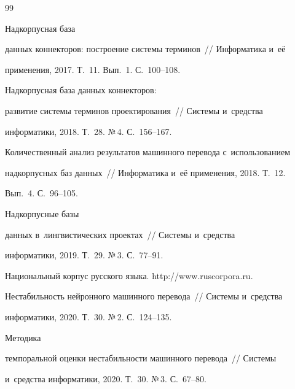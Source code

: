 {{\begin{thebibliography}{99}


 Надкорпусная база 


данных коннекторов: построение системы терминов~/\!\!/ Информатика и~её 


применения, 2017. Т.~11. Вып.~1. С.~100--108.




 Надкорпусная база данных коннекторов: 


развитие системы терминов проектирования~/\!\!/ Системы и~средства 


информатики, 2018. Т.~28. №\,4. С.~156--167.












Количественный анализ результатов машинного перевода с~использованием 


надкорпусных баз данных~/\!\!/ Информатика и~её применения, 2018. Т.~12. 


Вып.~4.   С.~96--105.




 Надкорпусные базы 


данных в~лингвистических проектах~/\!\!/ Системы и~средства 


информатики, 2019. Т.~29. №\,3. С.~77--91.




Национальный корпус русского языка. {\sf http://www.ruscorpora.ru}.






Нестабильность нейронного машинного перевода~/\!\!/ Системы и~средства 


информатики, 2020. Т.~30. №\,2. С.~124--135.




 Методика 


темпоральной оценки нестабильности машинного перевода~/\!\!/ Системы 


и~средства информатики, 2020. Т.~30. №\,3. С.~67--80.



\end{thebibliography}}}
